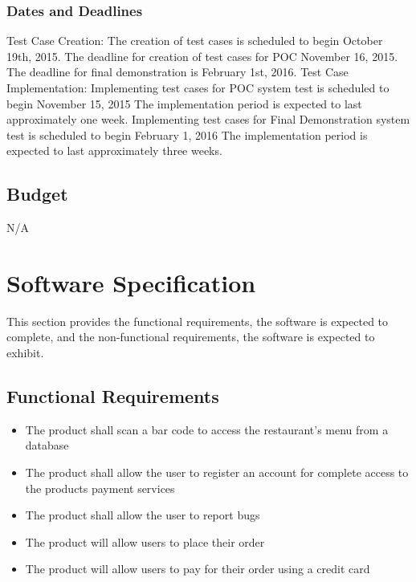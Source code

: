 \documentclass[12pt]{article}
\begin{document}
\subsubsection{Dates and Deadlines}

Test Case Creation:
The creation of test cases is scheduled to begin October 19th, 2015. The deadline for creation of test cases for POC November 16, 2015. The deadline for final demonstration is February 1st, 2016.
\newline
\newline
Test Case Implementation:
Implementing test cases for POC system test is scheduled to begin November 15, 2015 The implementation period is expected to last approximately one week. 
\newline
\newline
Implementing test cases for Final Demonstration system test is scheduled to begin February 1, 2016 The implementation period is expected to last approximately three weeks. 

\subsection{Budget}
N/A

%
%

\section{ Software Specification}
This section provides the functional requirements, the 
software is expected to complete, and the non-functional requirements, the software is expected to exhibit.

\subsection{Functional Requirements}

\noindent
\begin{itemize}
\item The product shall scan a bar code to access the restaurant's menu from a database
\item The product shall allow the user to register an account for complete access to the products payment services
\item The product shall allow the user to report bugs
\item The product will allow users to place their order
\item The product will allow users to pay for their order using a credit card
\end{itemize} 
\end{document}

